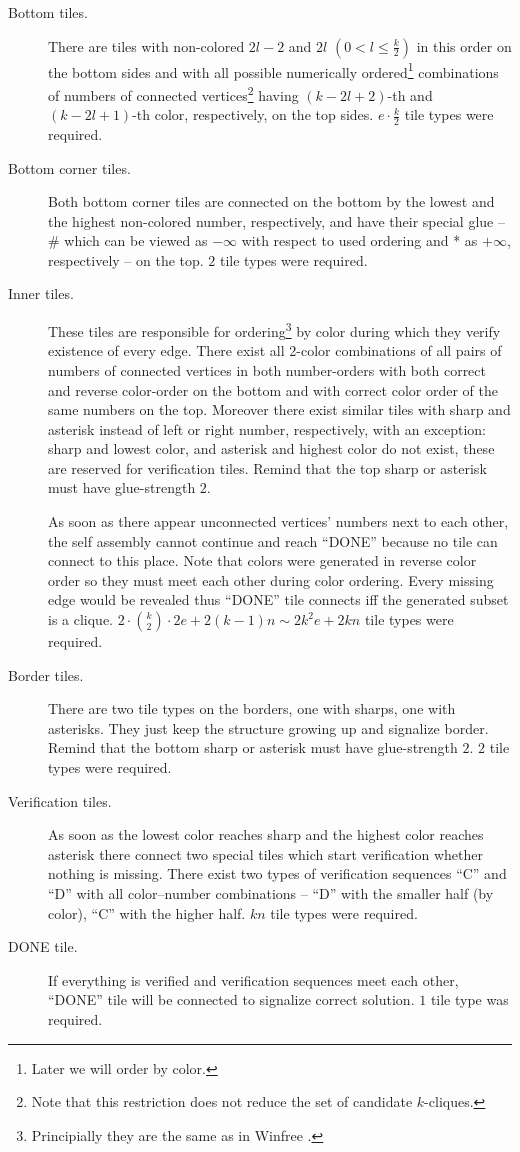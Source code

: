 \begin{description}
	\item[Bottom tiles.] There are tiles with non-colored $2l-2$ and $2l$ $(0 < l \leq \frac{k}{2})$ in this order on the bottom sides and with all possible numerically ordered\footnote{Later we will order by color.} combinations of numbers of connected vertices\footnote{Note that this restriction does not reduce the set of candidate $k$-cliques.} having $(k-2l+2)$-th and $(k-2l+1)$-th color, respectively, on the top sides. $e\cdot \frac{k}{2}$ tile types were required.
	\item[Bottom corner tiles.] Both bottom corner tiles are connected on the bottom by the lowest and the highest non-colored number, respectively, and have their special glue -- \# which can be viewed as $-\infty$ with respect to used ordering and * as $+\infty$, respectively -- on the top. $2$ tile types were required.
	\item[Inner tiles.] These tiles are responsible for ordering\footnote{Principially they are the same as in Winfree \cite{winfree_phd}.} by color during which they verify existence of every edge. There exist all 2-color combinations of all pairs of numbers of connected vertices in both number-orders with both correct and reverse color-order on the bottom and with correct color order of the same numbers on the top. Moreover there exist similar tiles with sharp and asterisk instead of left or right number, respectively, with an exception: sharp and lowest color, and asterisk and highest color do not exist, these are reserved for verification tiles. Remind that the top sharp or asterisk must have glue-strength $2$.
	
	As soon as there appear unconnected vertices' numbers next to each other, the self assembly cannot continue and reach ``DONE'' because no tile can connect to this place. Note that colors were generated in reverse color order so they must meet each other during color ordering. Every missing edge would be revealed thus ``DONE'' tile connects iff the generated subset is a clique. $2\cdot\binom{k}{2}\cdot 2e + 2(k-1)n \sim 2 k^2 e + 2kn$ tile types were required. %
	\item[Border tiles.] There are two tile types on the borders, one with sharps, one with asterisks. They just keep the structure growing up and signalize border. Remind that the bottom sharp or asterisk must have glue-strength $2$. $2$ tile types were required.
	\item[Verification tiles.] As soon as the lowest color reaches sharp and the highest color reaches asterisk there connect two special tiles which start verification whether nothing is missing. There exist two types of verification sequences ``C'' and ``D'' with all color--number combinations -- ``D'' with the smaller half (by color), ``C'' with the higher half. $kn$ tile types were required.
	\item[DONE tile.] If everything is verified and verification sequences meet each other, ``DONE'' tile will be connected to signalize correct solution. $1$ tile type was required.
\end{description}

